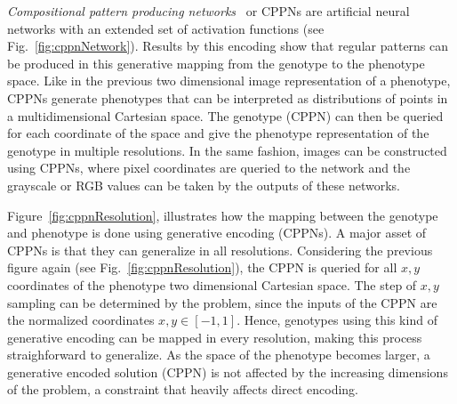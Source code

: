 \emph{Compositional pattern producing networks}~\citep{stanley2007compositional} or CPPNs are artificial neural networks with an extended set of activation functions (see Fig.~\ref{fig:cppnNetwork}). Results by this encoding show that regular patterns can be produced in this generative mapping from the genotype to the phenotype space. Like in the previous two dimensional image representation of a phenotype, CPPNs generate phenotypes that can be interpreted as distributions of points in a multidimensional Cartesian space. The genotype (CPPN) can then be queried for each coordinate of the space and give the phenotype representation of the genotype in multiple resolutions. In the same fashion, images can be constructed using CPPNs, where pixel coordinates are queried to the network and the grayscale or RGB values can be taken by the outputs of these networks. 


Figure~\ref{fig:cppnResolution}, illustrates how the mapping between the genotype and phenotype is done using generative encoding (CPPNs). A major asset of CPPNs is that they can generalize in all resolutions. Considering the previous figure again (see Fig.~\ref{fig:cppnResolution}), the CPPN is queried for all $x,y$ coordinates of the phenotype two dimensional Cartesian space. The step of $x,y$ sampling can be determined by the problem, since the inputs of the CPPN are the normalized coordinates $x,y \in [-1,1]$. Hence, genotypes using this kind of generative encoding can be mapped in every resolution, making this process straighforward to generalize. As the space of the phenotype becomes larger, a generative encoded solution (CPPN) is not affected by the increasing dimensions of the problem, a constraint that heavily affects direct encoding.

